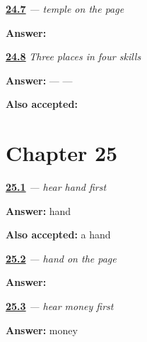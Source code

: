 \noindent\begin{minipage}[t]{\linewidth}
\raggedright
\hyperlink{review-GU-C20-mandir-write}{\textbf{24.7}} \emph{ — temple on the page}\par
\small \textbf{Answer:} \par
\end{minipage}\par\medskip

\noindent\begin{minipage}[t]{\linewidth}
\raggedright
\hyperlink{review-GU-C20-places-three-payoff}{\textbf{24.8}} \emph{Three places in four skills}\par
\small \textbf{Answer:}  —  — \par
\footnotesize \textbf{Also accepted:}   
\end{minipage}\par\medskip

\section*{Chapter 25}

\noindent\begin{minipage}[t]{\linewidth}
\raggedright
\hyperlink{review-GU-C21-hear-haath-recall}{\textbf{25.1}} \emph{ — hear hand first}\par
\small \textbf{Answer:} hand\par
\footnotesize \textbf{Also accepted:} a hand
\end{minipage}\par\medskip

\noindent\begin{minipage}[t]{\linewidth}
\raggedright
\hyperlink{review-GU-C21-haath-write}{\textbf{25.2}} \emph{ — hand on the page}\par
\small \textbf{Answer:} \par
\end{minipage}\par\medskip

\noindent\begin{minipage}[t]{\linewidth}
\raggedright
\hyperlink{review-GU-C21-hear-paisa-recall}{\textbf{25.3}} \emph{ — hear money first}\par
\small \textbf{Answer:} money\par
\end{minipage}\par\medskip

